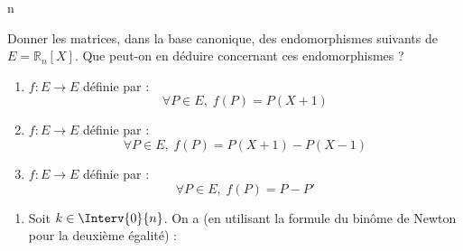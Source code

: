 n\documentclass[a4paper,10pt]{report}
\begin{document}
\begin{Exa} Donner les matrices, dans la base canonique, des endomorphismes suivants de $E=\mathbb{R}_n[X]$. Que peut-on en déduire concernant ces endomorphismes ?

\begin{enumerate}
\item $f : E \rightarrow E$ définie par :
$$ \forall P \in E, \; f(P) = P(X+1) $$
\item $f : E \rightarrow E$ définie par :
$$ \forall P \in E, \; f(P) = P(X+1)-P(X-1) $$
\item $f : E \rightarrow E$ définie par :
$$ \forall P \in E, \; f(P) = P-P' $$
\end{enumerate}
\end{Exa} 

\begin{enumerate}
\item Soit $k \in \Interv{0}{n}$. On a (en utilisant la formule du binôme de Newton pour la deuxième égalité) : 


\end{enumerate}
\end{document}
